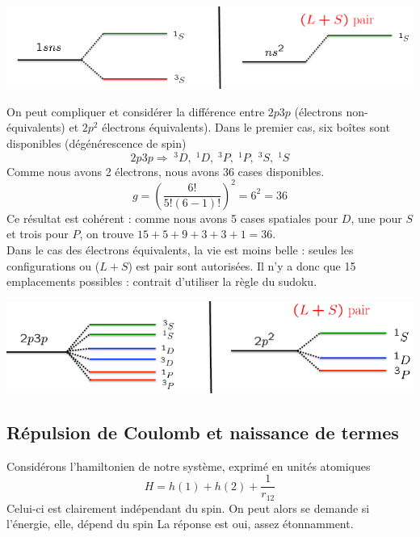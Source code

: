 \begin{center}
\includegraphics[scale=0.5]{ch3/image5}
\end{center}
 
On peut compliquer et considérer la différence entre $2p3p$ (électrons non-équivalents) et $2p^2$ électrons équivalents). Dans le premier cas, six boîtes sont disponibles (dégénérescence de spin)
\begin{equation}
2p3p\Rightarrow \; ^3D, \; ^1D, \; ^3P, \; ^1P, \; ^3S, \; ^1S
\end{equation}
Comme nous avons 2 électrons, nous avons 36 cases disponibles. 
\begin{equation}
g =  \left( \frac{6!}{5!(6-1)!} \right) ^2 = 6^2 = 36
\end{equation}
Ce résultat est cohérent : comme nous avons 5 cases spatiales pour $D$, une pour $S$ et trois 
pour $P$, on trouve $15 + 5 + 9 + 3 + 3 + 1=36$.\\

Dans le cas des électrons équivalents, la vie est moins belle : seules les configurations ou ($L+S$) est pair sont autorisées. Il n'y a donc que 15 emplacements possibles : contrait d'utiliser la règle du sudoku.


\begin{center}
\includegraphics[scale=0.5]{ch3/image6}
\end{center} 


\subsection{Répulsion de Coulomb et naissance de termes}
Considérons l'hamiltonien de notre système, exprimé en unités atomiques
\begin{equation}
H = h(1) + h(2) + \frac{1}{r_{12}}
\end{equation}
Celui-ci est clairement indépendant du spin. On peut alors se demande si l'énergie, elle, dépend du spin La réponse est oui, assez étonnamment.\\

